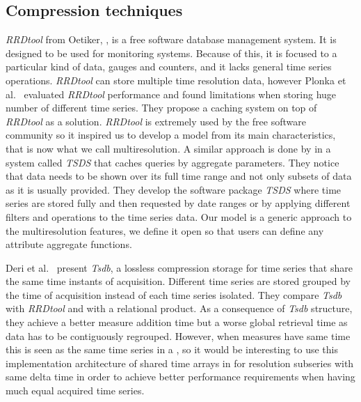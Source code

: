 \subsection{Compression techniques}





\emph{RRDtool} from Oetiker, \cite{rrdtool,lisa98:oetiker}, is a free
software database management system. It is designed to be used for
monitoring systems. Because of this, it is focused to a particular
kind of data, gauges and counters, and it lacks general time series
operations. \emph{RRDtool} can store multiple time resolution data,
however Plonka et al.\ \cite{lisa07:plonka} evaluated \emph{RRDtool}
performance and found limitations when storing huge number of
different time series. They propose a caching system on top of
\emph{RRDtool} as a solution.  \emph{RRDtool} is extremely used by the
free software community so it inspired us to develop a model from its
main characteristics, that is now what we call multiresolution. A
similar approach is done by \cite{weigel10} in a system called
\emph{TSDS} that caches queries by aggregate parameters. They notice
that data needs to be shown over its full time range and not only
subsets of data as it is usually provided.  They develop the software
package \emph{TSDS} where time series are stored fully and then
requested by date ranges or by applying different filters and
operations to the time series data.  Our  model is a generic
approach to the multiresolution features, we define it open so that
users can define any attribute aggregate functions.


Deri et al.\ \cite{deri12:tsdb_compressed_database} present
\emph{Tsdb}, a lossless compression storage  for time
series that share the same time instants of acquisition. Different
time series are stored grouped by the time of acquisition instead of
each time series isolated.  They compare \emph{Tsdb} with \emph{RRDtool} and
with a relational product. As a consequence of \emph{Tsdb} structure,
they achieve a better measure addition time but a worse global
retrieval time as data has to be contiguously regrouped. However, when
measures have same time this is seen as the same time series in a
, so it would be interesting to use this implementation
architecture of shared time arrays in  for resolution subseries
with same delta time in order to achieve better performance requirements
when having much equal acquired time series.


